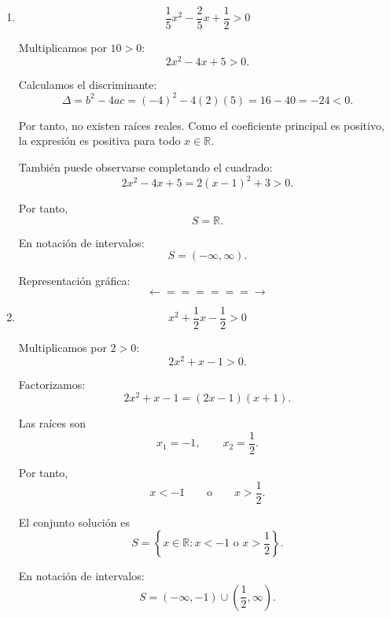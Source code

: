 \documentclass[12pt]{article}
\theoremstyle{plain}
\theoremstyle{definition}
\theoremstyle{remark}
\begin{document}
{\begin{enumerate}
Factorizamos:
\[
2x^2-7x+6=(2x-3)(x-2).
\]

Las raíces son
\[
x_1=\frac{3}{2},
\qquad
x_2=2.
\]

Como la parábola abre hacia arriba,
\[
x<\frac{3}{2}
\qquad \text{o} \qquad
x>2.
\]

El conjunto solución es
\[
\boxed{
S=
\left\{
x\in\mathbb{R}:
x<\frac{3}{2}
\text{ o }
x>2
\right\}.
}
\]

En notación de intervalos:
\[
\boxed{
S=
\left(-\infty,\frac{3}{2}\right)
\cup
(2,\infty).
}
\]

Representación gráfica:
\[
\longleftarrow\!\!=\!\!=\!\circ
\quad \frac{3}{2}
\qquad\qquad
2\quad
\circ\!\!=\!\!=\!\longrightarrow
\]

\item
\[
\frac{1}{5}x^2-\frac{2}{5}x+\frac{1}{2}>0
\]

Multiplicamos por \(10>0\):
\[
2x^2-4x+5>0.
\]

Calculamos el discriminante:
\[
\Delta=b^2-4ac
=(-4)^2-4(2)(5)
=16-40
=-24<0.
\]

Por tanto, no existen raíces reales. Como el coeficiente principal es
positivo, la expresión es positiva para todo \(x\in\mathbb{R}\).

También puede observarse completando el cuadrado:
\[
2x^2-4x+5
=
2(x-1)^2+3>0.
\]

Por tanto,
\[
\boxed{
S=\mathbb{R}.
}
\]

En notación de intervalos:
\[
\boxed{
S=(-\infty,\infty).
}
\]

Representación gráfica:
\[
\longleftarrow\!\!=\!\!=\!\!=\!\!=\!\!=\!\!=\!\longrightarrow
\]

\item
\[
x^2+\frac{1}{2}x-\frac{1}{2}>0
\]

Multiplicamos por \(2>0\):
\[
2x^2+x-1>0.
\]

Factorizamos:
\[
2x^2+x-1=(2x-1)(x+1).
\]

Las raíces son
\[
x_1=-1,
\qquad
x_2=\frac{1}{2}.
\]

Por tanto,
\[
x<-1
\qquad \text{o} \qquad
x>\frac{1}{2}.
\]

El conjunto solución es
\[
\boxed{
S=
\left\{
x\in\mathbb{R}:
x<-1
\text{ o }
x>\frac{1}{2}
\right\}.
}
\]

En notación de intervalos:
\[
\boxed{
S=
(-\infty,-1)
\cup
\left(\frac{1}{2},\infty\right).
}
\]


\end{enumerate}}
\end{document}
